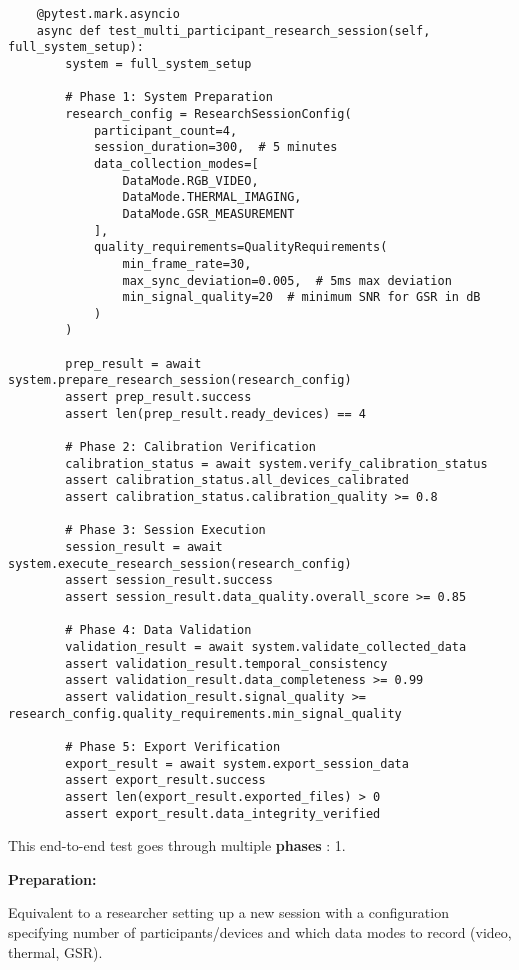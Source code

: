 {{\begin{verbatim}
    @pytest.mark.asyncio
    async def test_multi_participant_research_session(self, full_system_setup):
        system = full_system_setup
        
        # Phase 1: System Preparation
        research_config = ResearchSessionConfig(
            participant_count=4,
            session_duration=300,  # 5 minutes
            data_collection_modes=[
                DataMode.RGB_VIDEO,
                DataMode.THERMAL_IMAGING,
                DataMode.GSR_MEASUREMENT
            ],
            quality_requirements=QualityRequirements(
                min_frame_rate=30,
                max_sync_deviation=0.005,  # 5ms max deviation
                min_signal_quality=20  # minimum SNR for GSR in dB
            )
        )
        
        prep_result = await system.prepare_research_session(research_config)
        assert prep_result.success
        assert len(prep_result.ready_devices) == 4
        
        # Phase 2: Calibration Verification
        calibration_status = await system.verify_calibration_status
        assert calibration_status.all_devices_calibrated
        assert calibration_status.calibration_quality >= 0.8
        
        # Phase 3: Session Execution
        session_result = await system.execute_research_session(research_config)
        assert session_result.success
        assert session_result.data_quality.overall_score >= 0.85
        
        # Phase 4: Data Validation
        validation_result = await system.validate_collected_data
        assert validation_result.temporal_consistency
        assert validation_result.data_completeness >= 0.99
        assert validation_result.signal_quality >= research_config.quality_requirements.min_signal_quality
        
        # Phase 5: Export Verification
        export_result = await system.export_session_data
        assert export_result.success
        assert len(export_result.exported_files) > 0
        assert export_result.data_integrity_verified
\end{verbatim}

This end-to-end test goes through multiple \textbf{phases}
: 1.

\textbf{Preparation:}

Equivalent to a researcher setting up a new session with a configuration
specifying number of participants/devices and which data modes to record (video,
thermal, GSR).

}}
